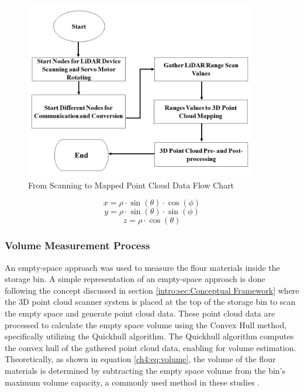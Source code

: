 \begin{figure}[H]
	\centering
	\includegraphics[width=0.9\textwidth]{Figures/scanning-to-pc-flow-chart}
	\caption{From Scanning to Mapped Point Cloud Data Flow Chart}
	\label{ch3:fig:scanning-to-pc-flow-chart}
\end{figure}

\begin{equation}
	\label{ch3:eq:x}
	x = \rho \cdot \sin(\theta) \cdot \cos(\phi)
\end{equation}
\begin{equation}
	\label{ch3:eq:y}
	y = \rho \cdot \sin(\theta) \cdot \sin(\phi)
\end{equation}
\begin{equation}
	\label{ch3:eq:z}
	z = \rho \cdot \cos(\theta)
\end{equation}

\subsubsection{Volume Measurement Process}
\label{ch3:sec:Volume Estimation}
An empty-space approach was used to measure the flour materials inside the storage bin. A simple representation of an empty-space approach is done following the concept discussed in section \ref{intro:sec:Conceptual Framework} where the 3D point cloud scanner system is placed at the top of the storage bin to scan the empty space and generate point cloud data. These point cloud data are processed to calculate the empty space volume using the Convex Hull method, specifically utilizing the Quickhull algorithm. The Quickhull algorithm computes the convex hull of the gathered point cloud data, enabling for volume estimation. Theoretically, as shown in equation \ref{ch4:eq:volume}, the volume of the flour materials is determined by subtracting the empty space volume from the bin's maximum volume capacity, a commonly used method in these studies \citet{raba2020,clar2022}.

